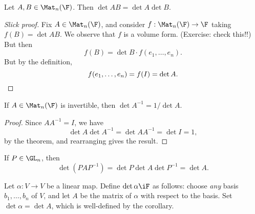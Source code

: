 \vspace{3pt}



\begin{theorem}
	Let $A,B\in\Mat_n(\F)$. Then $\det AB=\det A \det B$. %
\end{theorem}

\begin{proof}
	[Slick proof] Fix $A\in\Mat_n(\F)$, and consider $f:\Mat_n(\F)\to\F$ taking $f(B) = \det AB$. We observe that $f$ is a volume form. (Exercise: check this!!) But then %
	\begin{equation*}
		f(B) = \det B \cdot f(e_1,\ldots,e_n).
	\end{equation*}
	But by the definition,
	\begin{equation*}
		f(e_1,\ldots,e_n) = f(I) = \det A. \qedhere
	\end{equation*}
\end{proof}

\begin{corollary}
	If $A\in\Mat_n(\F)$ is invertible, then $\det A^{-1}=1/\det A$.
\end{corollary}
\vspace{-6pt}
\begin{proof}
	Since $AA^{-1}=I$, we have %
	\begin{equation*}
		\det A \det A^{-1} = \det {AA^{-1}} = \det I = 1,
	\end{equation*}
	by the theorem, and rearranging gives the result.
\end{proof}

\begin{corollary}
	If $P\in\GL_n$, then
	\begin{equation*}
		\det(PAP^{-1})=\det P \det A \det P^{-1} = \det A.
	\end{equation*}
\end{corollary}
\vspace{-9pt}
\begin{definition}
	Let $\alpha:V\to V$ be a linear map. Define $\det\alpha\iF$ as follows: choose \emph{any} basis $b_1,\ldots,b_n$ of $V$, and let $A$ be the matrix of $\alpha$ with respect to the basis. Set $\det\alpha=\det A$, which is well-defined by the corollary. %
\end{definition}
\vspace{3pt}

